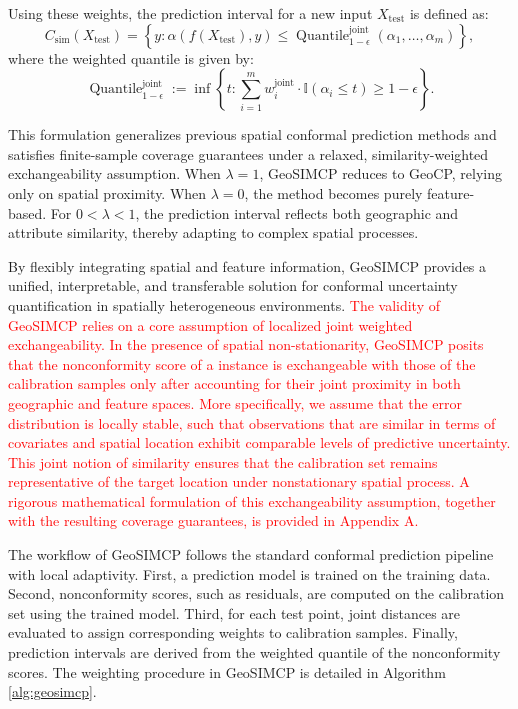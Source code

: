 \documentclass[authoryear,preprint,review,12pt]{elsarticle}
\begin{document}
Using these weights, the prediction interval for a new input $X_{\text{test}}$ is defined as:
\begin{equation}
C_{\text{sim}}(X_{\text{test}}) = \left\{ y : \alpha(f(X_{\text{test}}), y) \leq \operatorname{Quantile}_{1 - \epsilon}^{\text{joint}}(\alpha_1, \dots, \alpha_m) \right\},
\end{equation}
where the weighted quantile is given by:
\begin{equation}
\operatorname{Quantile}_{1 - \epsilon}^{\text{joint}} := \inf \left\{ t : \sum_{i=1}^m w_i^{\text{joint}} \cdot \mathbb{I}(\alpha_i \leq t) \geq 1 - \epsilon \right\}.
\end{equation}

This formulation generalizes previous spatial conformal prediction methods and satisfies finite-sample coverage guarantees under a relaxed, similarity-weighted exchangeability assumption. When $\lambda = 1$, GeoSIMCP reduces to GeoCP, relying only on spatial proximity. When $\lambda = 0$, the method becomes purely feature-based. For $0 < \lambda < 1$, the prediction interval reflects both geographic and attribute similarity, thereby adapting to complex spatial processes.

By flexibly integrating spatial and feature information, GeoSIMCP provides a unified, interpretable, and transferable solution for conformal uncertainty quantification in spatially heterogeneous environments.
\textcolor{red}{The validity of GeoSIMCP relies on a core assumption of localized joint weighted exchangeability. In the presence of spatial non-stationarity, GeoSIMCP posits that the nonconformity score of a instance is exchangeable with those of the calibration samples only after accounting for their joint proximity in both geographic and feature spaces. More specifically, we assume that the error distribution is locally stable, such that observations that are similar in terms of covariates and spatial location exhibit comparable levels of predictive uncertainty. This joint notion of similarity ensures that the calibration set remains representative of the target location under nonstationary spatial process. A rigorous mathematical formulation of this exchangeability assumption, together with the resulting coverage guarantees, is provided in Appendix A.}


The workflow of GeoSIMCP follows the standard conformal prediction pipeline with local adaptivity. First, a prediction model is trained on the training data. Second, nonconformity scores, such as residuals, are computed on the calibration set using the trained model. Third, for each test point, joint distances are evaluated to assign corresponding weights to calibration samples. Finally, prediction intervals are derived from the weighted quantile of the nonconformity scores. The weighting procedure in GeoSIMCP is detailed in Algorithm \ref{alg:geosimcp}.
\end{document}
